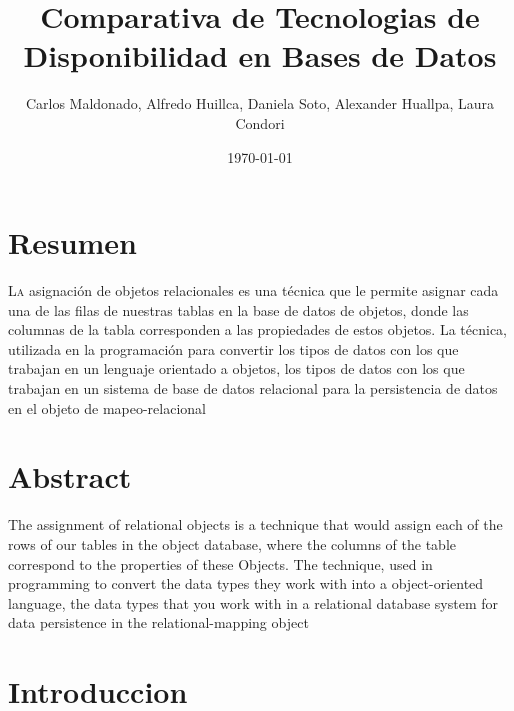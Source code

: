 \documentclass[twoside,twocolumn]{article}
\title{Comparativa de Tecnologias de Disponibilidad en Bases de Datos} %
\author{Carlos Maldonado, Alfredo Huillca, Daniela Soto, Alexander Huallpa, Laura Condori}
\date{\today} %
\begin{document}
\maketitle


\section{Resumen}

\lettrine[nindent=0em,lines=3]{L}a asignación de objetos relacionales es una técnica que le permite asignar cada una de las filas de nuestras
tablas en la base de datos de objetos, donde las columnas de la tabla corresponden a las propiedades de estos
objetos. La técnica, utilizada en la programación para convertir los tipos de datos con los que trabajan en un
lenguaje orientado a objetos, los tipos de datos con los que trabajan en un sistema de base de datos relacional
para la persistencia de datos en el objeto de mapeo-relacional




\section{Abstract}


The assignment of relational objects is a technique that would assign each of the rows of our
tables in the object database, where the columns of the table correspond to the properties of these
Objects. The technique, used in programming to convert the data types they work with into a
object-oriented language, the data types that you work with in a relational database system
for data persistence in the relational-mapping object




\section{Introduccion}
\end{document}
